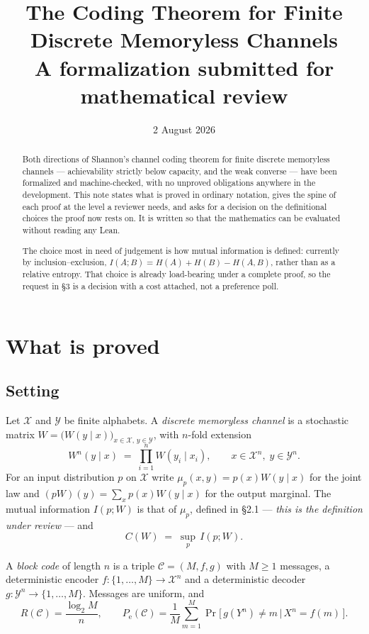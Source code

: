 \documentclass[11pt,a4paper]{article}
\title{\bfseries The Coding Theorem for Finite\\ Discrete Memoryless Channels\\[4pt]
       \large A formalization submitted for mathematical review}
\author{}
\date{2 August 2026}
\newcommand{\X}{\mathcal{X}}
\newcommand{\Y}{\mathcal{Y}}
\newcommand{\Pe}{P_{\mathrm{e}}}
\newcommand{\code}{\mathcal{C}}
\begin{document}
\maketitle

\begin{abstract}
\noindent
Both directions of Shannon's channel coding theorem for finite discrete
memoryless channels --- achievability strictly below capacity, and the weak
converse --- have been formalized and machine-checked, with no unproved
obligations anywhere in the development. This note states what is proved in
ordinary notation, gives the spine of each proof at the level a reviewer needs,
and asks for a decision on the definitional choices the proof now rests on. It
is written so that the mathematics can be evaluated without reading any Lean.

The choice most in need of judgement is how mutual information is defined:
currently by inclusion--exclusion, $I(A;B) = H(A)+H(B)-H(A,B)$, rather than as a
relative entropy. That choice is already load-bearing under a complete proof, so
the request in \S3 is a decision with a cost attached, not a preference poll.
\end{abstract}

\section{What is proved}

\subsection{Setting}

Let $\X$ and $\Y$ be finite alphabets. A \emph{discrete memoryless channel} is a
stochastic matrix $W = \bigl(W(y\mid x)\bigr)_{x\in\X,\,y\in\Y}$, with $n$-fold
extension
\[
  W^{n}(y\mid x) \;=\; \prod_{i=1}^{n} W(y_i \mid x_i),
  \qquad x\in\X^{n},\; y\in\Y^{n}.
\]
For an input distribution $p$ on $\X$ write $\mu_p(x,y) = p(x)W(y\mid x)$ for the
joint law and $(pW)(y) = \sum_{x} p(x)W(y\mid x)$ for the output marginal. The
mutual information $I(p;W)$ is that of $\mu_p$, defined in \S2.1 --- \emph{this is
the definition under review} --- and
\[
  C(W) \;=\; \sup_{p}\, I(p;W).
\]

A \emph{block code} of length $n$ is a triple $\code = (M,f,g)$ with $M \ge 1$
messages, a deterministic encoder $f : \{1,\dots,M\}\to\X^{n}$ and a
deterministic decoder $g : \Y^{n}\to\{1,\dots,M\}$. Messages are uniform, and
\[
  R(\code) = \frac{\log_2 M}{n},
  \qquad
  \Pe(\code) = \frac1M \sum_{m=1}^{M}
    \Pr\bigl[\, g(Y^{n}) \neq m \,\big|\, X^{n} = f(m) \,\bigr].
\]
\end{document}
